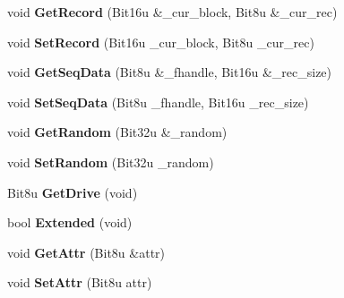 \begin{DoxyCompactItemize}
\item 
\hypertarget{classDOS__FCB_ad7e60e5dae86e9ff4cedd4ec7e7e0172}{void {\bfseries Get\-Record} (Bit16u \&\-\_\-cur\-\_\-block, Bit8u \&\-\_\-cur\-\_\-rec)}\label{classDOS__FCB_ad7e60e5dae86e9ff4cedd4ec7e7e0172}

\item 
\hypertarget{classDOS__FCB_aa4f8785c2b5e67e613e38a2663cc08b2}{void {\bfseries Set\-Record} (Bit16u \-\_\-cur\-\_\-block, Bit8u \-\_\-cur\-\_\-rec)}\label{classDOS__FCB_aa4f8785c2b5e67e613e38a2663cc08b2}

\item 
\hypertarget{classDOS__FCB_a2e9b07c8a0a281e21f6151e4766cd741}{void {\bfseries Get\-Seq\-Data} (Bit8u \&\-\_\-fhandle, Bit16u \&\-\_\-rec\-\_\-size)}\label{classDOS__FCB_a2e9b07c8a0a281e21f6151e4766cd741}

\item 
\hypertarget{classDOS__FCB_abf271ce081ed4cd9e6ec5dd8b8b8aad0}{void {\bfseries Set\-Seq\-Data} (Bit8u \-\_\-fhandle, Bit16u \-\_\-rec\-\_\-size)}\label{classDOS__FCB_abf271ce081ed4cd9e6ec5dd8b8b8aad0}

\item 
\hypertarget{classDOS__FCB_ab49248721f42da4974744a8810027230}{void {\bfseries Get\-Random} (Bit32u \&\-\_\-random)}\label{classDOS__FCB_ab49248721f42da4974744a8810027230}

\item 
\hypertarget{classDOS__FCB_aa6d6128bfcca69f73790e0e07be677da}{void {\bfseries Set\-Random} (Bit32u \-\_\-random)}\label{classDOS__FCB_aa6d6128bfcca69f73790e0e07be677da}

\item 
\hypertarget{classDOS__FCB_a6da07c697a956f04f9df2fa0cb9249ab}{Bit8u {\bfseries Get\-Drive} (void)}\label{classDOS__FCB_a6da07c697a956f04f9df2fa0cb9249ab}

\item 
\hypertarget{classDOS__FCB_ad4a466929e2135cbbf36cce3f93c1009}{bool {\bfseries Extended} (void)}\label{classDOS__FCB_ad4a466929e2135cbbf36cce3f93c1009}

\item 
\hypertarget{classDOS__FCB_aead0618722ff1f674547679cd38451ad}{void {\bfseries Get\-Attr} (Bit8u \&attr)}\label{classDOS__FCB_aead0618722ff1f674547679cd38451ad}

\item 
\hypertarget{classDOS__FCB_ac0a82ec6f3d72a69d54579fa640c5669}{void {\bfseries Set\-Attr} (Bit8u attr)}\label{classDOS__FCB_ac0a82ec6f3d72a69d54579fa640c5669}


\end{DoxyCompactItemize}
